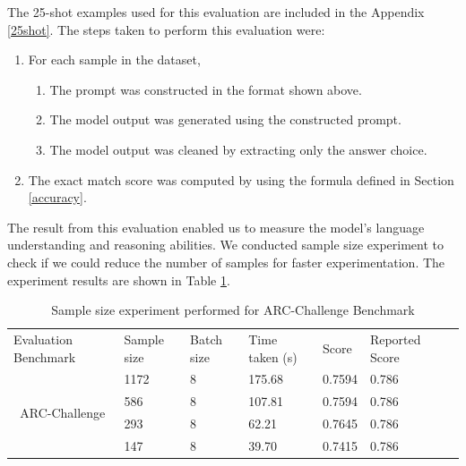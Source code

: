 The 25-shot examples used for this evaluation are included in the Appendix \ref{25shot}. The steps taken to perform this evaluation were:
\begin{enumerate}
\item For each sample in the dataset,
\begin{enumerate} [label*=\arabic*.]
\item The prompt was constructed in the format shown above.
\item The model output was generated using the constructed prompt.
\item The model output was cleaned by extracting only the answer choice.
\end{enumerate}
\item The exact match score was computed by using the formula defined in Section \ref{accuracy}.
\end{enumerate}
The result from this evaluation enabled us to measure the model’s language understanding and reasoning abilities. 
We conducted sample size experiment to check if we could reduce the number of samples for faster experimentation. The experiment results are shown in Table \ref{tab:ARCSampleExperiment}.

\begin{table}[H]
\centering
\caption{Sample size experiment performed for ARC-Challenge Benchmark}
\begin{tabular}{lllllll}
\cline{1-6}
\multicolumn{1}{|l|}{Evaluation   Benchmark}         & \multicolumn{1}{l|}{Sample size} & \multicolumn{1}{l|}{Batch size} & \multicolumn{1}{l|}{Time taken (s)} & \multicolumn{1}{l|}{Score}  & \multicolumn{1}{l|}{Reported   Score} &  \\ \cline{1-6}
\multicolumn{1}{|c|}{\multirow{4}{*}{ARC-Challenge}} & \multicolumn{1}{l|}{1172}        & \multicolumn{1}{l|}{8}          & \multicolumn{1}{l|}{175.68}         & \multicolumn{1}{l|}{0.7594} & \multicolumn{1}{l|}{0.786}            &  \\ \cline{2-6}
\multicolumn{1}{|c|}{}                               & \multicolumn{1}{l|}{586}         & \multicolumn{1}{l|}{8}          & \multicolumn{1}{l|}{107.81}         & \multicolumn{1}{l|}{0.7594} & \multicolumn{1}{l|}{0.786}            &  \\ \cline{2-6}
\multicolumn{1}{|c|}{}                               & \multicolumn{1}{l|}{293}         & \multicolumn{1}{l|}{8}          & \multicolumn{1}{l|}{62.21}          & \multicolumn{1}{l|}{0.7645} & \multicolumn{1}{l|}{0.786}            &  \\ \cline{2-6}
\multicolumn{1}{|c|}{}                               & \multicolumn{1}{l|}{147}         & \multicolumn{1}{l|}{8}          & \multicolumn{1}{l|}{39.70}          & \multicolumn{1}{l|}{0.7415} & \multicolumn{1}{l|}{0.786}            &  \\ \cline{1-6}
\end{tabular}
\label{tab:ARCSampleExperiment}
\end{table}

